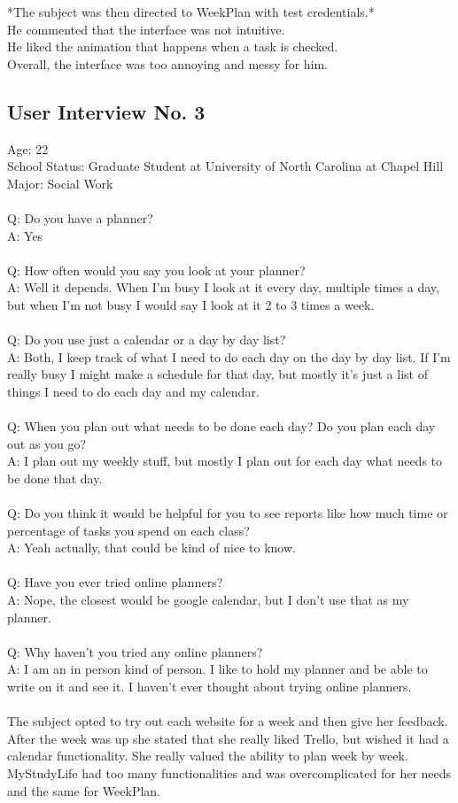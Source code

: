 *The subject was then directed to WeekPlan with test credentials.*\\
He commented that the interface was not intuitive.\\
He liked the animation that happens when a task is checked.\\
Overall, the interface was too annoying and messy for him.

\subsection{User Interview No. 3}
Age: 22\\
School Status: Graduate Student at University of North Carolina at Chapel Hill\\
Major: Social Work\\ \\
Q: Do you have a planner?\\
A: Yes \\ \\
Q: How often would you say you look at your planner?\\
A: Well it depends. When I’m busy I look at it every day, multiple times a day, but when I’m not busy I would say I look at it 2 to 3 times a week.\\ \\
Q: Do you use just a calendar or a day by day list?\\
A: Both, I keep track of what I need to do each day on the day by day list. If I’m really busy I might make a schedule for that day, but mostly it’s just a list of things I need to do each day and my calendar.\\ \\
Q: When you plan out what needs to be done each day? Do you plan each day out as you go? \\
A: I plan out my weekly stuff, but mostly I plan out for each day what needs to be done that day. \\ \\
Q: Do you think it would be helpful for you to see reports like how much time or percentage of tasks you spend on each class? \\
A: Yeah actually, that could be kind of nice to know. \\ \\
Q: Have you ever tried online planners? \\
A: Nope, the closest would be google calendar, but I don’t use that as my planner. \\ \\
Q: Why haven’t you tried any online planners? \\
A: I am an in person kind of person. I like to hold my planner and be able to write on it and see it. I haven’t ever thought about trying online planners. \\ \\
The subject opted to try out each website for a week and then give her feedback.
\\After the week was up she stated that she really liked Trello, but wished it had a calendar functionality. She really valued the ability to plan week by week. MyStudyLife had too many functionalities and was overcomplicated for her needs and the same for WeekPlan.

